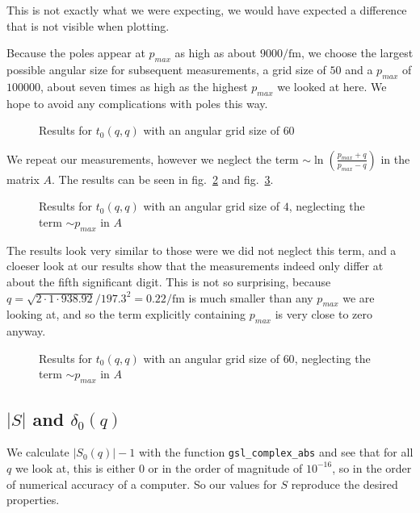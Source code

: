 \documentclass{scrartcl}
\begin{document}
This is not exactly what we were expecting, we would have expected a difference that is not visible when plotting. 

Because the poles appear at $p_{max}$ as high as about $9000\si{\per\femto\meter}$, we choose the largest possible angular size for subsequent measurements, a grid size of $50$ and a $p_{max}$ of $100000$, about seven times as high as the highest $p_{max}$ we looked at here. We hope to avoid any complications with poles this way.

\begin{figure}[htbp]
	
	\caption{Results for $t_0(q,q)$ with an angular grid size of $60$}
	\label{fig:tnnbigangsize}
\end{figure}

We repeat our measurements, however we neglect the term $\sim \ln\left(\frac{p_{max}+q}{p_{max}-q}\right)$ in the matrix $A$. The results can be seen in fig.~\ref{fig:tnnsmallangsizewopm} and fig.~\ref{fig:tnnbigangsizewopm}. 

\begin{figure}[htbp]
	
	\caption{Results for $t_0(q,q)$ with an angular grid size of $4$, neglecting the term $\sim p_{max}$ in $A$}
	\label{fig:tnnsmallangsizewopm}
\end{figure}

The results look very similar to those were we did not neglect this term, and a cloeser look at our results show that the measurements indeed only differ at about the fifth significant digit. This is not so surprising, because $q=\sqrt{2\cdot1\cdot 938.92}/197.3^2=0.22\si{\per\femto\meter}$ is much smaller than any $p_{max}$ we are looking at, and so the term explicitly containing $p_{max}$ is very close to zero anyway.

\begin{figure}[htbp]
	
	\caption{Results for $t_0(q,q)$ with an angular grid size of $60$, neglecting the term $\sim p_{max}$ in $A$}
	\label{fig:tnnbigangsizewopm}
\end{figure}

\subsection{$|S|$ and $\delta_0(q)$}
We calculate $|S_0(q)|-1$ with the function \texttt{gsl\_complex\_abs} and see that for all $q$ we look at, this is either 0 or in the order of magnitude of $10^{-16}$, so in the order of numerical accuracy of a computer. So our values for $S$ reproduce the desired properties. 
\end{document}
